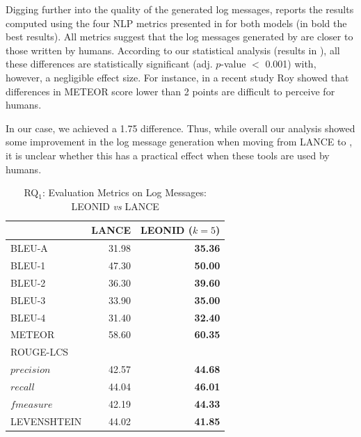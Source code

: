 Digging further into the quality of the generated log messages,  reports the results computed using the four NLP metrics presented in  for both models (in bold the best results). All metrics suggest that the log messages generated by \approach are closer to those written by humans. According to our statistical analysis (results in \cite{replication}), all these differences are statistically significant (adj. $p$-value $<$ 0.001) with, however, a negligible effect size. For instance, in a recent study Roy \etal \cite{metricsImprovement} showed that differences in METEOR score lower than 2 points are difficult to perceive for humans. 

In our case, we achieved a 1.75 difference. Thus, while overall our analysis showed some improvement in the log message generation when moving from LANCE to \approach, it is unclear whether this has a practical effect when these tools are used by humans.

\begin{table}[h]
	\vspace{-0.2cm}
	\centering
	\caption{RQ$_1$: Evaluation Metrics on Log Messages: LEONID \emph{vs} LANCE\vspace{-0.3cm}}
	\scriptsize
	\label{tab:log-messages-stats}
	\begin{tabular}{lrr}
		\toprule
		& {\bf LANCE}  &  {\bf LEONID ($k=5$)} \\\midrule
		BLEU-A \cite{papineni2002bleu}& 31.98 & \bf 35.36\\
			\hspace{0.2cm} BLEU-1 & 47.30  & \bf 50.00\\
			\hspace{0.2cm} BLEU-2 & 36.30  & \bf 39.60\\
			\hspace{0.2cm} BLEU-3 & 33.90  & \bf 35.00\\
			\hspace{0.2cm} BLEU-4 & 31.40  & \bf 32.40\\
		METEOR \cite{meteor} & 58.60  & \bf 60.35 \\
		ROUGE-LCS \cite{lin2004rouge} &  \\
		\hspace{0.2cm} $precision$ & 42.57 & \bf 44.68\\
		\hspace{0.2cm} $recall$ & 44.04 &   \bf 46.01\\
		\hspace{0.2cm} $fmeasure$ & 42.19 &  \bf 44.33\\
		LEVENSHTEIN \cite{levenshtein1966} & 44.02 & \bf 41.85 \\\bottomrule
	\end{tabular} 
	\vspace{-0.2cm}
\end{table}


